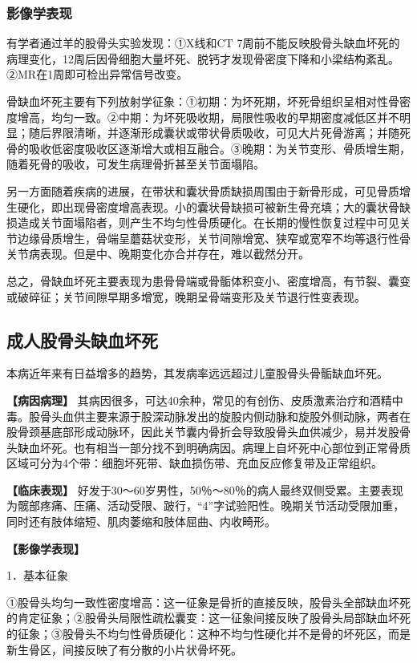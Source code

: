 \subsubsection{影像学表现}

有学者通过羊的股骨头实验发现：①X线和CT
7周前不能反映股骨头缺血坏死的病理变化，12周后因骨细胞大量坏死、脱钙才发现骨密度下降和小梁结构紊乱。②MR在1周即可检出异常信号改变。

骨缺血坏死主要有下列放射学征象：①初期：为坏死期，坏死骨组织呈相对性骨密度增高，均匀一致。②中期：为坏死吸收期，局限性吸收的早期密度减低区并不明显；随后界限清晰，并逐渐形成囊状或带状骨质吸收，可见大片死骨游离；并随死骨的吸收低密度吸收区逐渐增大或相互融合。③晚期：为关节变形、骨质增生期，随着死骨的吸收，可发生病理骨折甚至关节面塌陷。

另一方面随着疾病的进展，在带状和囊状骨质缺损周围由于新骨形成，可见骨质增生硬化，即出现骨密度增高表现。小的囊状骨缺损可被新生骨充填；大的囊状骨缺损造成关节面塌陷者，则产生不均匀性骨质硬化。在长期的慢性恢复过程中可见关节边缘骨质增生，骨端呈蘑菇状变形，关节间隙增宽、狭窄或宽窄不均等退行性骨关节病表现。但是中、晚期变化亦合并存在，难以截然分开。

总之，骨缺血坏死主要表现为患骨骨端或骨骺体积变小、密度增高，有节裂、囊变或破碎征；关节间隙早期多增宽，晚期呈骨端变形及关节退行性变表现。

\subsection{成人股骨头缺血坏死}

本病近年来有日益增多的趋势，其发病率远远超过儿童股骨头骨骺缺血坏死。

\textbf{【病因病理】}
其病因很多，可达40余种，常见的有创伤、皮质激素治疗和酒精中毒。股骨头血供主要来源于股深动脉发出的旋股内侧动脉和旋股外侧动脉，两者在股骨颈基底部形成动脉环，因此关节囊内骨折会导致股骨头血供减少，易并发股骨头缺血坏死。也有相当一部分找不到明确病因。病理上自坏死中心部位到正常骨质区域可分为4个带：细胞坏死带、缺血损伤带、充血反应修复带及正常组织。

\textbf{【临床表现】}
好发于30～60岁男性，50％～80％的病人最终双侧受累。主要表现为髋部疼痛、压痛、活动受限、跛行，“4”字试验阳性。晚期关节活动受限加重，同时还有肢体缩短、肌肉萎缩和肢体屈曲、内收畸形。

\textbf{【影像学表现】}

1．基本征象

①股骨头均匀一致性密度增高：这一征象是骨折的直接反映，股骨头全部缺血坏死的肯定征象；②股骨头局限性疏松囊变：这一征象间接反映了股骨头局部缺血坏死的征象；③股骨头不均匀性骨质硬化：这种不均匀性硬化并不是骨的坏死区，而是新生骨区，间接反映了有分散的小片状骨坏死。

